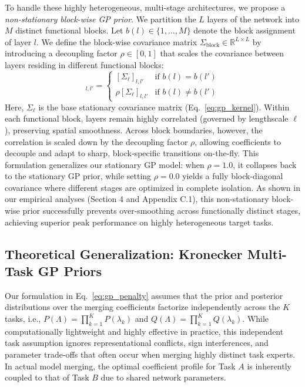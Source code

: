 To handle these highly heterogeneous, multi-stage architectures, we propose a
\emph{non-stationary block-wise GP prior}. We partition the $L$ layers of the
network into $M$ distinct functional blocks. Let $b(l) \in \{1, \dots, M\}$
denote the block assignment of layer $l$. We define the block-wise covariance
matrix $\Sigma_{\text{block}} \in \mathbb{R}^{L \times L}$ by introducing a
decoupling factor $\rho \in [0, 1]$ that scales the covariance between layers
residing in different functional blocks:
\begin{equation}
[\Sigma_{\text{block}}]_{l, l'} = 
\begin{cases}
[\Sigma_{\ell}]_{l, l'} & \text{if } b(l) = b(l') \\
\rho [\Sigma_{\ell}]_{l, l'} & \text{if } b(l) \neq b(l')
\end{cases}
\label{eq:block_covariance}
\end{equation}
Here, $\Sigma_{\ell}$ is the base stationary covariance matrix (Eq.~\ref{eq:gp_kernel}).
Within each functional block, layers remain highly correlated (governed by
lengthscale $\ell$), preserving spatial smoothness. Across block boundaries,
however, the correlation is scaled down by the decoupling factor $\rho$, allowing
coefficients to decouple and adapt to sharp, block-specific transitions on-the-fly.
This formulation generalizes our stationary GP model: when $\rho = 1.0$, it
collapses back to the stationary GP prior, while setting $\rho = 0.0$ yields a
fully block-diagonal covariance where different stages are optimized in complete
isolation. As shown in our empirical analyses (Section 4 and Appendix C.1), this
non-stationary block-wise prior successfully prevents over-smoothing across
functionally distinct stages, achieving superior peak performance on highly
heterogeneous target tasks.

\subsection{Theoretical Generalization: Kronecker Multi-Task GP Priors}
\label{subsec:multitask_gp}

Our formulation in Eq.~\ref{eq:gp_penalty} assumes that the prior and posterior
distributions over the merging coefficients factorize independently across the
$K$ tasks, i.e., $P(\Lambda) = \prod_{k=1}^K P(\lambda_k)$ and $Q(\Lambda) =
\prod_{k=1}^K Q(\lambda_k)$. While computationally lightweight and highly
effective in practice, this independent task assumption ignores representational
conflicts, sign interferences, and parameter trade-offs that often occur when
merging highly distinct task experts. In actual model merging, the optimal
coefficient profile for Task $A$ is inherently coupled to that of Task $B$ due
to shared network parameters.

